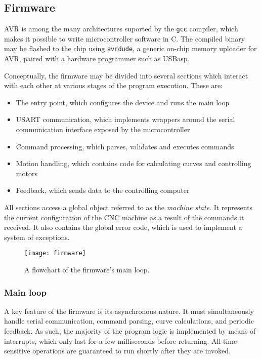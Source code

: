 \subsection{Firmware}

AVR is among the many architectures suported by the \texttt{gcc} compiler,
which makes it possible to write microcontroller software in C. The compiled
binary may be flashed to the chip using \texttt{avrdude}, a generic
on-chip memory uploader for AVR, paired with a hardware programmer such as
USBasp.

Conceptually, the firmware may be divided into several sections which interact
with each other at various stages of the program execution. These are:
\begin{itemize}
    \item The entry point, which configures the device and runs the main loop
    \item USART communication, which implements wrappers around the serial
    communication interface exposed by the microcontroller
    \item Command processing, which parses, validates and executes commands
    \item Motion handling, which contains code for calculating curves and
    controlling motors
    \item Feedback, which sends data to the controlling computer
\end{itemize}
All sections access a global object referred to as the \textit{machine state}.
It represents the current configuration of the CNC machine as a result of the
commands it received. It also contains the global error code, which is used to
implement a system of exceptions.

\begin{figure}[ht]
    \begin{center}
        \texttt{[image: firmware]}
        \caption{A flowchart of the firmware's main loop.}
        \label{firmware}
    \end{center}
\end{figure}

\subsubsection{Main loop}

A key feature of the firmware is its asynchronous nature. It must simultaneously
handle serial communication, command parsing, curve calculations, and periodic
feedback. As such, the majority of the program logic is implemented by means of
interrupts, which only last for a few milliseconds before returning. All
time-sensitive operations are guaranteed to run shortly after they are invoked.

